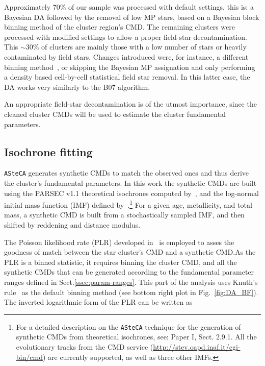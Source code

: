 \documentclass[draft]{aa}
\begin{document}
Approximately 70\% of our sample was processed with default settings, this is: a
Bayesian DA followed by the removal of low MP stars, based on a Bayesian block
binning method of the cluster region's CMD.\@
%
The remaining clusters were processed with modified settings to allow a proper
field-star decontamination. This ${\sim}$30\% of clusters are mainly those with
a low number of stars or heavily contaminated by field stars.
Changes introduced were, for instance, a different binning
method~\citep[often a rectangular grid using Scott's rule,][]{Scott_1979},
or skipping the Bayesian MP assignation and only performing a density based
cell-by-cell statistical field star removal. In this latter case, the DA works
very similarly to the B07 algorithm.

An appropriate field-star decontamination is of the utmost importance, since the
cleaned cluster CMDs will be used to estimate the cluster fundamental parameters.



\subsection{Isochrone fitting}
\label{ssec:isoch-fit}

\texttt{ASteCA} generates synthetic CMDs to match the observed ones and thus
derive the cluster's fundamental parameters. In this work the synthetic CMDs are
built using the PARSEC v1.1 theoretical isochrones computed
by~\citet[][B12]{Bressan_2012}, and the log-normal initial mass function (IMF)
defined by~\cite{Chabrier_2001}.\footnote{For a detailed description on the
\texttt{ASteCA} technique for the generation of synthetic CMDs from
theoretical isochrones, see: Paper I, Sect. 2.9.1. All the evolutionary tracks
from the CMD service (\url{http://stev.oapd.inaf.it/cgi-bin/cmd}) are currently
supported, as well as three other IMFs.}
For a given age, metallicity, and total mass, a synthetic CMD is built
from a stochastically sampled IMF, and then shifted by reddening and distance
modulus.

The Poisson likelihood rate (PLR) developed in~\cite{Dolphin_2002} is employed
to asses the goodness of match between the star cluster's CMD and a synthetic
CMD.\@ As the PLR is a binned statistic, it requires binning the cluster CMD,
and all the synthetic CMDs that can be generated according to the fundamental
parameter ranges defined in Sect.\ref{ssec:param-ranges}.
This part of the analysis uses Knuth's rule~\citep[][also implemented via the
astroML package]{Knuth_2006} as the default binning method (see bottom right
plot in Fig.~\ref{fig:DA_BF}).
%
The inverted logarithmic form of the PLR can be written as
\end{document}
